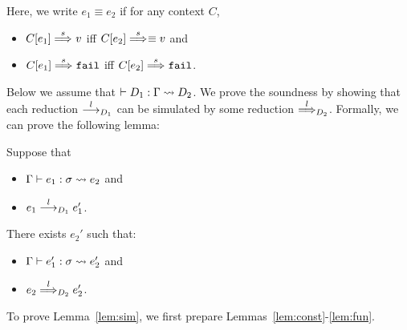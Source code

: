   {}
Here, we write \(e_1 \equiv e_2\) if for any context \(C\),
\begin{itemize}
\item \(C[e_1] \stackrel{s}{\Longrightarrow}_{} v\) iff \(C[e_2] \stackrel{s}{\Longrightarrow}_{}\equiv v\) and
\item \(C[e_1] \stackrel{s}{\Longrightarrow}_{} \mathtt{fail}\) iff \(C[e_2] \stackrel{s}{\Longrightarrow}_{} \mathtt{fail}\).
\end{itemize}


Below we assume that \(\vdash D_1 : \Gamma \leadsto D_2\). We prove the soundness
by showing that each reduction \(\stackrel{l}{\longrightarrow}_{D_1}\) can be simulated by
some reduction \(\stackrel{l}{\Longrightarrow}_{D_2}\). Formally, we can prove the
following lemma:
\begin{lemma}
\label{lem:sim}
%
Suppose that
\begin{itemize}
\item \(\Gamma \vdash e_1 : \sigma \leadsto e_2\) and
\item \(e_1 \stackrel{l}{\longrightarrow}_{D_1} e_1'\).
\end{itemize}
There exists \(e_2'\) such that:
\begin{itemize}
\item \(\Gamma \vdash e_1' : \sigma \leadsto e_2'\) and
\item \(e_2 \stackrel{l}{\Longrightarrow}_{D_2} e_2'\).
\end{itemize}
\end{lemma}
To prove Lemma~\ref{lem:sim}, we first prepare
Lemmas~\ref{lem:const}-\ref{lem:fun}.

